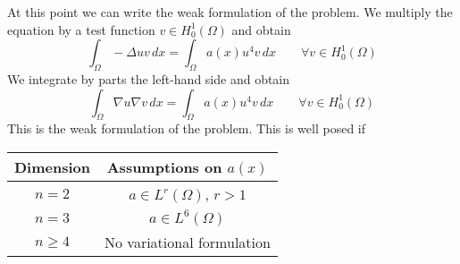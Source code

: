     At this point we can write the weak formulation of the problem. We multiply the equation by a test function \(v \in H^1_0(\Omega)\) and obtain 
    \[
        \int_\Omega - \Delta u v \, dx = \int_\Omega a(x) u^4 v \, dx \qquad \forall v \in H^1_0(\Omega)
    \]
    We integrate by parts the left-hand side and obtain
    \[
        \int_\Omega \nabla u \nabla v \, dx = \int_\Omega a(x) u^4 v \, dx \qquad \forall v \in H^1_0(\Omega)
    \]
    This is the weak formulation of the problem. This is well posed if 
    \begin{table}[h]
        \centering
        \begin{tabular}{|c|c|}
            \hline
            Dimension & Assumptions on $a(x)$ \\
            \hline
            $n = 2$ & $a \in L^r(\Omega)$, $r > 1$ \\
            $n = 3$ & $a \in L^6(\Omega)$ \\
            $n \geq 4$ & No variational formulation \\
            \hline
        \end{tabular}
    \end{table}

